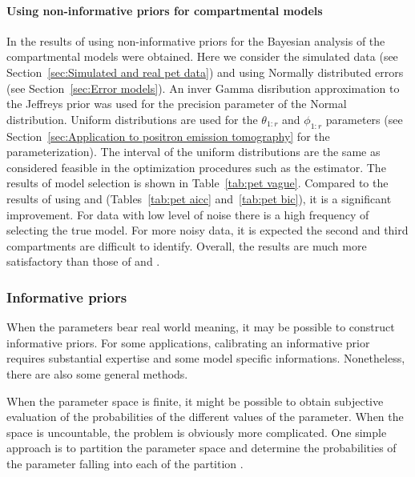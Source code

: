 \paragraph{Using non-informative priors for \pet compartmental models}

In \cite{Zhou2013} the results of using non-informative priors for the
Bayesian analysis of the \pet compartmental models were obtained. Here we
consider the simulated data (see Section~\ref{sec:Simulated and real pet
data}) and using Normally distributed errors (see Section~\ref{sec:Error
models}). An inver Gamma disribution approximation to the Jeffreys prior was
used for the precision parameter of the Normal distribution. Uniform
distributions are used for the $\theta_{1:r}$ and $\phi_{1:r}$ parameters
(see Section~\ref{sec:Application to positron emission tomography} for the
parameterization). The interval of the uniform distributions are the same as
considered feasible in the optimization procedures such as the \nls
estimator. The results of model selection is shown in Table~\ref{tab:pet
vague}. Compared to the results of using \aicc and \bic (Tables~\ref{tab:pet
aicc} and~\ref{tab:pet bic}), it is a significant improvement. For data with
low level of noise there is a high frequency of selecting the true model. For
more noisy data, it is expected the second and third compartments are
difficult to identify. Overall, the results are much more satisfactory than
those of \aicc and \bic.



\subsubsection{Informative priors}
\label{ssub:Informative priors}

When the parameters bear real world meaning, it may be possible to construct
informative priors. For some applications, calibrating an informative prior
requires substantial expertise and some model specific informations.
Nonetheless, there are also some general methods.

When the parameter space is finite, it might be possible to obtain subjective
evaluation of the probabilities of the different values of the parameter.
When the space is uncountable, the problem is obviously more complicated. One
simple approach is to partition the parameter space and determine the
probabilities of the parameter falling into each of the partition
\cite[][sec.~3.2.2]{Robert:2007tc}.

